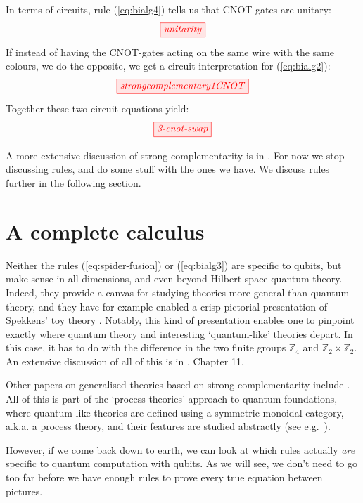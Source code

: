 \documentclass[11pt]{article}
\theoremstyle{definition}
\begin{document}
In terms of circuits, rule (\ref{eq:bialg4}) tells us that CNOT-gates are unitary:
\[ 
\tikzfig{unitarity}
\]
If instead of having the CNOT-gates acting on the same wire with the same colours, we do the opposite, we get a circuit interpretation for (\ref{eq:bialg2}):
\[ 
\tikzfig{strongcomplementary1CNOT}
\] 
Together these two circuit equations yield:
\[ 
\tikzfig{3-cnot-swap}   
\] 

A more extensive discussion of strong complementarity is in \cite{CKbook}. For now we stop discussing rules, and do some stuff with the ones we have.  We discuss rules further in the following section.

\section{A complete calculus}\label{sec:compl}%

Neither the rules (\ref{eq:spider-fusion}) or (\ref{eq:bialg3}) are specific to qubits, but make sense in all dimensions, and even beyond Hilbert space quantum theory. Indeed, they provide a canvas for studying theories more general than quantum theory, and they have for example enabled a crisp pictorial presentation of Spekkens' toy theory \cite{CEToy, CES, MiriamSpek}. Notably, this kind of presentation enables one to pinpoint exactly where quantum theory and interesting `quantum-like' theories depart. In this case, it has to do with the difference in the two finite groups $\mathbb{Z}_4$ and $\mathbb{Z}_2\times\mathbb{Z}_2$. An extensive discussion of all of this is in \cite{CKbook}, Chapter 11.

Other papers on generalised theories based on strong complementarity include \cite{CDKZ, gogioso2015schroedinger, gogioso2015fourier, CDKZ2, gogioso2019diagrammatic, gogioso2019generalised}. All of this is part of the `process theories' approach to quantum foundations, where quantum-like theories are defined using a symmetric monoidal category, a.k.a. a process theory, and their features are studied abstractly (see e.g.~\cite{JTF, selby2017leaks, gogioso2018categorical, gogioso2018density, selby2018reconstructing, lee2018no,coecke2016terminality, kissinger2017categorical, pinzani2019categorical, pinzani2020giving}).

However, if we come back down to earth, we can look at which rules actually \textit{are} specific to quantum computation with qubits. As we will see, we don't need to go too far before we have enough rules to prove every true equation between pictures.
\end{document}
